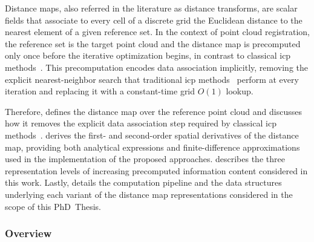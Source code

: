 Distance maps, also referred in the literature as distance transforms,
are scalar fields that associate to every cell of a discrete grid
the Euclidean distance to the nearest element of a given reference set.
In the context of point cloud registration, the reference set is
the target point cloud and the distance map is precomputed only once before
the iterative optimization begins, in contrast to classical
\gls{icp} methods~\cite{besl-mckay:tpami:1992,chen-medioni:icra:1991}.
This precomputation encodes data association implicitly,
removing the explicit nearest-neighbor search that traditional
\gls{icp} methods~\cite{besl-mckay:tpami:1992,chen-medioni:icra:1991} perform at
every iteration and replacing it with a constant-time grid $O(1)$ lookup.

Therefore,  defines the
distance map over the reference point cloud and discusses how it removes the
explicit data association step required by classical
\gls{icp} methods~\cite{besl-mckay:tpami:1992,chen-medioni:icra:1991}.
 derives the first- and
second-order spatial derivatives of the distance map, providing both
analytical expressions and finite-difference approximations used in
the implementation of the proposed approaches.
 describes the three
representation levels of increasing precomputed information content considered
in this work. Lastly, 
details the computation pipeline and the data structures underlying each variant
of the distance map representations considered in the scope of this PhD~Thesis.

\subsubsection{Overview}
\label{sec:distance-maps:alignment:dmaps:overview}

